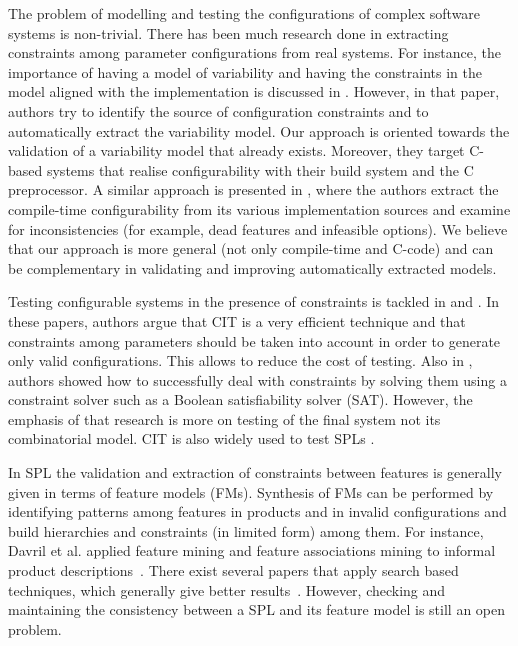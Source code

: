 \begin{tikzborder}{\cite{Gargantini16:validation}}
\begin{tikzborder}{\cite{gargantini_combinatorial_2017}}
\begin{tikzborder}{\cite{gargantini_combinatorial_2017}}
The problem of modelling and testing the configurations of complex software systems is non-trivial. There has been much research done in extracting constraints among parameter configurations from real systems. %
For instance, the importance of having a model of variability and having the constraints in the model aligned with the implementation is discussed in \cite{NadiBKC14}. However, in that paper, authors try to identify the source of configuration constraints and to automatically extract the variability model. Our approach is oriented towards the validation of a variability model that already exists. Moreover, they target C-based systems that realise configurability with their build system and the C preprocessor. 
A similar approach is presented in \cite{Tartler:2011}, where the authors extract the compile-time configurability from its various implementation sources and examine for inconsistencies (for example, dead features and infeasible options). We believe that our approach is more general (not only compile-time and C-code) and can be complementary in validating and improving automatically extracted models.

Testing configurable systems in the presence of constraints is tackled in \cite{CohenTSE08} and \cite{Petke15:practical}. In these papers, authors argue that CIT is a very efficient technique and that constraints among parameters should be taken into account in order to generate only valid configurations. This allows to reduce the cost of testing. Also in \cite{jar10}, authors showed how to successfully deal with constraints by solving them using a constraint solver such as a Boolean satisfiability solver (SAT). However, the emphasis of that research is more on testing of the final system not its combinatorial model. CIT is also widely used to test SPLs \cite{Perrouin010a}.

In SPL the validation and extraction of constraints between features is generally given in terms of feature models (FMs). Synthesis of FMs can be performed by identifying patterns among features in products and in invalid configurations and build hierarchies and constraints (in limited form) among them. For instance, Davril et al. applied feature mining and feature associations mining to informal product descriptions~\cite{Davril13}. There exist several papers that apply search based techniques, which generally give better results~\cite{SBSEforSPLsurvey,LopezHerrejon201533,FerreiraVQ13,lopez-herrejon_reverse_2012}. However, checking and maintaining the consistency between a SPL and its feature model is still an open problem. 






\end{tikzborder}
\end{tikzborder}
\end{tikzborder}
